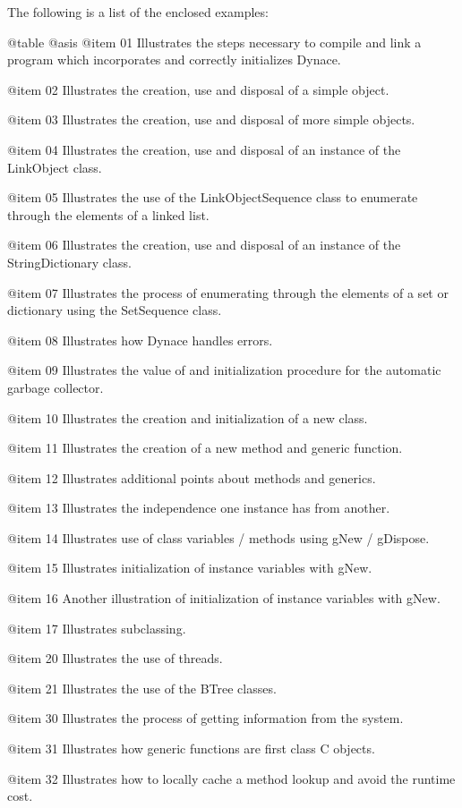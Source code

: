 The following is a list of the enclosed examples:

@table @asis
@item 01
Illustrates the steps necessary to compile and link a program which
incorporates and correctly initializes Dynace.

@item 02
Illustrates the creation, use and disposal of a simple object.

@item 03
Illustrates the creation, use and disposal of more simple objects.

@item 04
Illustrates the creation, use and disposal of an instance of the
LinkObject class.

@item 05
Illustrates the use of the LinkObjectSequence class to enumerate through
the elements of a linked list.

@item 06
Illustrates the creation, use and disposal of an instance of the
StringDictionary class.

@item 07
Illustrates the process of enumerating through the elements of a
set or dictionary using the SetSequence class.

@item 08
Illustrates how Dynace handles errors.

@item 09
Illustrates the value of and initialization procedure for the automatic
garbage collector.

@item 10
Illustrates the creation and initialization of a new class.

@item 11
Illustrates the creation of a new method and generic function.

@item 12
Illustrates additional points about methods and generics.

@item 13
Illustrates the independence one instance has from another.

@item 14
Illustrates use of class variables / methods using gNew / gDispose.

@item 15
Illustrates initialization of instance variables with gNew.

@item 16
Another illustration of initialization of instance variables with gNew.

@item 17
Illustrates subclassing.

@item 20
Illustrates the use of threads.

@item 21
Illustrates the use of the BTree classes.

@item 30
Illustrates the process of getting information from the system.

@item 31
Illustrates how generic functions are first class C objects.

@item 32
Illustrates how to locally cache a method lookup and avoid the
runtime cost.

